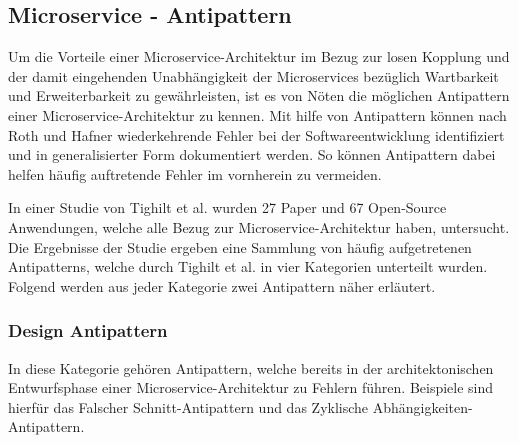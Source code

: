 \subsection{Microservice - Antipattern\label{subsec2.2.2:Unterunterpunkt-2}}

Um die Vorteile einer Microservice-Architektur im Bezug zur losen Kopplung und der damit eingehenden Unabhängigkeit der Microservices bezüglich Wartbarkeit und Erweiterbarkeit zu gewährleisten, ist es von Nöten die möglichen Antipattern einer Microservice-Architektur zu kennen. Mit hilfe von Antipattern können nach Roth und Hafner \cite{StephanRoth.2019} wiederkehrende Fehler bei der Softwareentwicklung identifiziert und in generalisierter Form dokumentiert werden. So können Antipattern dabei helfen häufig auftretende Fehler im vornherein zu vermeiden.

In einer Studie von Tighilt et al. \cite{Tighilt.072020} wurden 27 Paper und 67 Open-Source Anwendungen, welche alle Bezug zur Microservice-Architektur haben, untersucht. Die Ergebnisse der Studie \cite{Tighilt.072020} ergeben eine Sammlung von häufig aufgetretenen Antipatterns, welche durch Tighilt et al. in vier Kategorien unterteilt wurden. Folgend werden aus jeder Kategorie zwei Antipattern näher erläutert.

\subsubsection*{Design Antipattern}

In diese Kategorie gehören Antipattern, welche bereits in der architektonischen Entwurfsphase einer Microservice-Architektur zu Fehlern führen. Beispiele sind hierfür das \glqq Falscher Schnitt\grqq{}-Antipattern und das \glqq Zyklische Abhängigkeiten\grqq{}-Antipattern.

